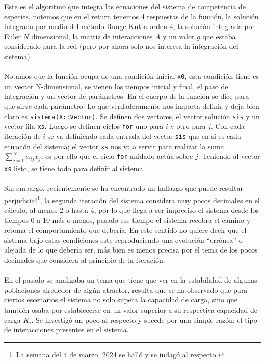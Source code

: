 \documentclass[11pt,a4paper]{article}
\begin{document}
Este es el algoritmo que integra las ecuaciones del sistema de competencia de especies, notemos que en el return tenemos 4 respuestas de la función, la solución integrada por medio del método Runge-Kutta orden 4, la solución integrada por Euler $N$ dimensional, la matriz de interacciones $A$ y un valor $g$ que estaba considerado para la red (pero por ahora solo nos interesa la integración del sistema).\\
\\
Notamos que la función ocupa de una condición inicial \texttt{x0}, esta condición tiene es un vector N-dimensional, se tienen los tiempos inicial y final, el paso de integración y un vector de parámetros. En el cuerpo de la función se dice para que sirve cada parámetro. Lo que verdaderamente nos importa definir y deja bien claro es \texttt{sistema(X::Vector)}. Se definen dos vectores, el vector solución \texttt{sis} y un vector fila \texttt{xs}. Luego se definen ciclos \texttt{for} uno para $i$ y otro para $j$. Con cada iteración de $i$ se va definiendo cada entrada del vector \texttt{sis} que en sí es cada ecuación del sistema; el vector \texttt{xs} nos va a servir para realizar la suma $\sum_{j=1}^{N}\alpha_{ij}x_j$, es por ello que el ciclo \texttt{for} anidado actúa sobre $j$. Teniendo al vector \texttt{xs} listo, se tiene todo para definir al sistema.\\
\\
Sin embargo, recientemente se ha encontrado un hallazgo que puede resultar perjudicial\footnote{La semana del 4 de marzo, 2024 se halló y se indagó al respecto.}, la segunda iteración del sistema considera muy pocos decimales en el cálculo, al menos 2 o hasta 4, por lo que llega a ser impreciso el sistema desde los tiempos 0 a 10 más o menos, pasado ese tiempo el sistema recobra el camino y retoma el comportamiento que debería. En este sentido no quiere decir que el sistema bajo estas condiciones este reproduciendo una evolución ``errónea'' o alejada de lo que debería ser, más bien es menos precisa por el tema de los pocos decimales que considera al principio de la iteración.\\
\\
En el pasado se analizaba un tema que tiene que ver en la estabilidad de algunas poblaciones alrededor de algún atractor, resulta que se ha observado que para ciertos escenarios el sistema no solo supera la capacidad de carga, sino que también osaba por establecerse en un valor superior a su respectiva capacidad de carga $K_i$. Se investigó un poco al respecto y sucede por una simple razón: el tipo de interacciones presentes en el sistema. \\
\end{document}
